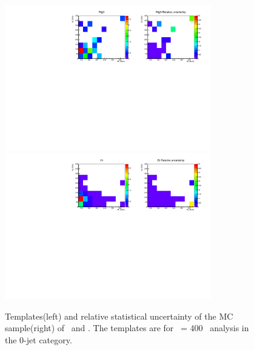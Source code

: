 \begin{figure}[htp]
\centering
\includegraphics[width=0.8\textwidth]{figures/2dtemplate_Wg3l_mH400_0j.pdf}
\includegraphics[width=0.8\textwidth]{figures/2dtemplate_Ztt_mH400_0j.pdf}
\caption{Templates(left) and relative statistical uncertainty of the MC sample(right) 
of \wgammastar\ and \ztt. 
The templates are for \mHi\ = 400 \GeV\ analysis in the 0-jet category.}
\label{fig:2dtemplate_400_0j_4}
\end{figure} 



